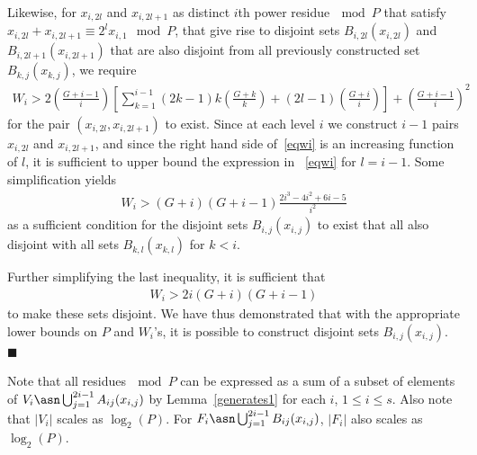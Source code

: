 Likewise, for  $x_{i,2l}$ and $x_{i,2l+1}$ as distinct $i$th power
residue$~\mod P$ that satisfy $x_{i,2l}+ x_{i,2l+1} \equiv
2^lx_{i,1} \mod P$, that give rise to disjoint sets
$B_{i,2l}(x_{i,2l})$ and $B_{i,2l+1}(x_{i,2l+1})$ that are also
disjoint from all previously constructed set $B_{k,j}(x_{k,j})$,
we require
\begin{equation}\label{eqwi}\begin{array}{lll} W_i>
2(\frac{G+i-1}{i}) \left[\sum_{k=1}^{i-1}
(2k-1)k(\frac{G+k}{k})+(2l-1)\left(
\frac{G+i}{i}\right)\right]+\left( \frac{G+i-1}{i}\right)^2
\end{array}\end{equation}
for the pair $(x_{i,2l},x_{i,2l+1})$ to exist. Since at each level
$i$ we construct $i-1$ pairs $x_{i,2l}$ and $x_{i,2l+1}$, and
since the right hand side of~\eqref{eqwi} is an increasing
function of $l$, it is sufficient to upper bound the expression in
~\eqref{eqwi} for $l=i-1$. Some simplification yields
\begin{equation}\begin{array}{lll} W_i>
(G+i)(G+i-1)\frac{2i^3-4i^2+6i-5}{i^2}
\end{array}\end{equation}
as a sufficient condition for the disjoint sets $B_{i,j}(x_{i,j})$
to exist that all also disjoint with all sets $B_{k,l}(x_{k,l})$
for $k<i$.

Further simplifying the last inequality, it is sufficient that
\begin{equation}\begin{array}{lll} W_i>
2i(G+i)(G+i-1)
\end{array}\end{equation}
to make these sets disjoint. We have thus demonstrated that with
the appropriate lower bounds on $P$ and $W_i$'s, it is possible to
construct disjoint sets $B_{i,j}(x_{i,j})$.
 \hfill$\blacksquare$

Note that all residues$~\mod P$ can be expressed as a sum of a
subset of elements of $V_i \asn
\bigcup_{j=1}^{2i-1}A_{ij}(x_{i,j})$ by Lemma~\ref{generates1} for
each $i$, $1\leq i \leq s$. Also note that $|V_i|$ scales as
$\log_2(P)$. For $F_i \asn \bigcup_{j=1}^{2i-1}B_{ij}(x_{i,j})$,
 $|F_i|$ also scales as
$\log_2(P)$.


